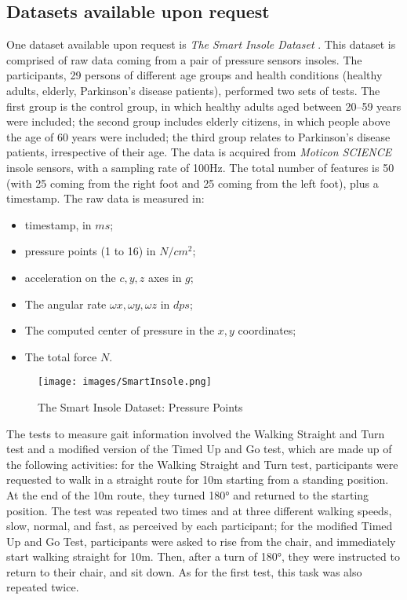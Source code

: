 \subsection{Datasets available upon request}
One dataset available upon request is \textit{The Smart Insole Dataset} \cite{TheSmartInsoleDataset}. This dataset is comprised of raw data coming from a pair of pressure sensors insoles.
The participants, 29 persons of different age groups and health conditions (healthy adults, elderly, Parkinson’s disease patients), performed two sets of tests. The first group is the control group, in which healthy adults aged between 20–59 years were included; the second group includes elderly citizens, in which people above the age of 60 years were included; the third group relates to Parkinson’s disease patients, irrespective of their age. 
The data is acquired from \textit{Moticon SCIENCE} insole sensors, with a sampling rate of 100Hz. The total number of features is 50 (with 25 coming from the right foot and 25 coming from the left foot), plus a timestamp. The raw data is measured in: 
\begin{itemize}
    \item timestamp, in \(ms\);
    \item pressure points (1 to 16) in \(N/cm^2\);
    \item acceleration on the \(c, y, z\) axes in \(g\);
    \item The angular rate \(\omega x, \omega y, \omega z\) in \(dps\);
    \item The computed center of pressure in the \(x,y\) coordinates;
    \item The total force \(N\).
\end{itemize}
\begin{figure}
    \centering
    \texttt{[image: images/SmartInsole.png]}
    \caption{The Smart Insole Dataset: Pressure Points}
    \label{fig:SmartInsole}
    \FloatBarrier
\end{figure}
The tests to measure gait information involved the Walking Straight and Turn test and a modified version of the Timed Up and Go test, which are made up of the following activities: for the Walking Straight and Turn test, participants were requested to walk in a straight route for 10m starting from a standing position. At the end of the 10m route, they turned 180° and returned to the starting position. The test was repeated two times and at three different walking speeds, slow, normal, and fast, as perceived by each participant; for the modified Timed Up and Go Test, participants were asked to rise from the chair, and immediately start walking straight for 10m. Then, after a turn of 180°, they were instructed to return to their chair, and sit down. As for the first test, this task was also repeated twice.

